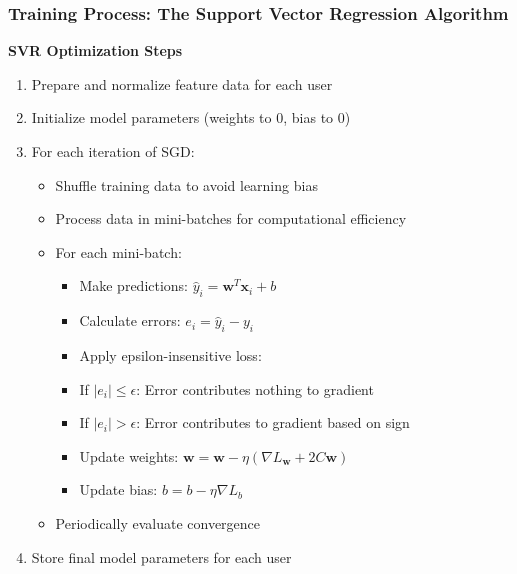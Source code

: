 \documentclass{beamer}
\begin{document}
\begin{frame}
\frametitle{Training Process: The Support Vector Regression Algorithm}
\textbf{SVR Optimization Steps}
\begin{enumerate}
    \item Prepare and normalize feature data for each user
    \item Initialize model parameters (weights to 0, bias to 0)
    \item For each iteration of SGD:
    \begin{itemize}
        \item Shuffle training data to avoid learning bias
        \item Process data in mini-batches for computational efficiency
        \item For each mini-batch:
        \begin{itemize}
            \item Make predictions: $\hat{y}_i = \mathbf{w}^T \mathbf{x}_i + b$
            \item Calculate errors: $e_i = \hat{y}_i - y_i$
            \item Apply epsilon-insensitive loss:
                \item If $|e_i| \leq \epsilon$: Error contributes nothing to gradient
                \item If $|e_i| > \epsilon$: Error contributes to gradient based on sign
            \item Update weights: $\mathbf{w} = \mathbf{w} - \eta (\nabla L_{\mathbf{w}} + 2C\mathbf{w})$
            \item Update bias: $b = b - \eta \nabla L_b$
        \end{itemize}
        \item Periodically evaluate convergence
    \end{itemize}
    \item Store final model parameters for each user
\end{enumerate}
\end{frame}
\end{document}
